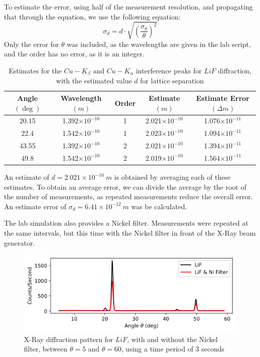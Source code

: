 \documentclass[a4paper]{article}
\begin{document}
To estimate the error, using half of the measurement resolution, and propagating that through the equation, we use the following equation:
\begin{equation}
\sigma_d=d\cdot\sqrt{\left(\frac{\sigma_\theta}\theta\right)^2}
\end{equation}
Only the error for $\theta$ was included, as the wavelengths are given in the lab script, and the order has no error, as it is an integer.

\begin{table}[h!]
\centering
\begin{tabular}{ccccc}
\hline
Angle $(\deg)$ & Wavelength $(m)$ & Order & Estimate $(m)$ & Estimate Error $(\Delta m)$\\ \hline
20.15 & 1.392$\times10^{-10}$  & 1 & 2.021$\times10^{-10}$ & 1.076$\times10^{-11}$ \\
22.4 & 1.542$\times10^{-10}$ & 1 & 2.023$\times10^{-10}$ & 1.094$\times10^{-11}$ \\
43.55 & 1.392$\times10^{-10}$  & 2 & 2.021$\times10^{-10}$ & 1.394$\times10^{-11}$ \\
49.8  & 1.542$\times10^{-10}$ & 2 & 2.019$\times10^{-10}$ & 1.564$\times10^{-11}$ \\
\end{tabular}
\caption{\label{tab:liftab}Estimates for the $Cu-K_\beta$ and $Cu-K_\alpha$ interference peaks for $LiF$ diffraction, with the estimated value $d$ for lattice separation}
\end{table}

An estimate of $d=2.021\times10^{-10}\ m$ is obtained by averaging each of these estimates. To obtain an average error, we can divide the average by the root of the number of measurements, as repeated measurements reduce the overall error. An estimate error of $\sigma_d=6.41\times10^{-12}\ m$ was be calculated.

The lab simulation also provides a Nickel filter. Measurements were repeated at the same intervals, but this time with the Nickel filter in front of the X-Ray beam generator.

\begin{figure}[h]
\centerline{\includegraphics[scale=0.8]{lifni.png}}
\caption{X-Ray diffraction pattern for $LiF$, with and without the Nickel filter, between $\theta=5$ and $\theta=60$, using a time period of 3 seconds}
\label{fig:lifni}
\end{figure}
\end{document}
